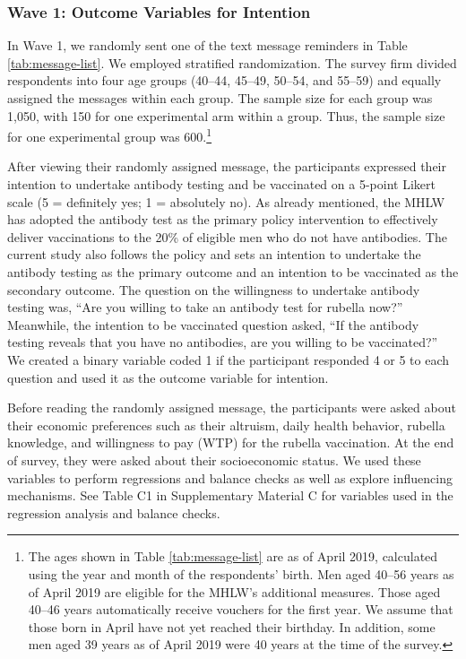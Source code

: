 \documentclass[
      12pt,
    a4paper
]{article}
\begin{document}
\hypertarget{wave1}{%
\subsubsection{Wave 1: Outcome Variables for Intention}\label{wave1}}

In Wave 1, we randomly sent one of the text message reminders in Table \ref{tab:message-list}. We employed stratified randomization. The survey firm divided respondents into four age groups (40--44, 45--49, 50--54, and 55--59) and equally assigned the messages within each group. The sample size for each group was 1,050, with 150 for one experimental arm within a group. Thus, the sample size for one experimental group was 600.\footnote{The ages shown in Table \ref{tab:message-list} are as of April 2019, calculated using the year and month of the respondents' birth. Men aged 40--56 years as of April 2019 are eligible for the MHLW's additional measures. Those aged 40--46 years automatically receive vouchers for the first year. We assume that those born in April have not yet reached their birthday. In addition, some men aged 39 years as of April 2019 were 40 years at the time of the survey.}

After viewing their randomly assigned message, the participants expressed their intention to undertake antibody testing and be vaccinated on a 5-point Likert scale (5 = definitely yes; 1 = absolutely no). As already mentioned, the MHLW has adopted the antibody test as the primary policy intervention to effectively deliver vaccinations to the 20\% of eligible men who do not have antibodies. The current study also follows the policy and sets an intention to undertake the antibody testing as the primary outcome and an intention to be vaccinated as the secondary outcome. The question on the willingness to undertake antibody testing was, ``Are you willing to take an antibody test for rubella now?'' Meanwhile, the intention to be vaccinated question asked, ``If the antibody testing reveals that you have no antibodies, are you willing to be vaccinated?'' We created a binary variable coded 1 if the participant responded 4 or 5 to each question and used it as the outcome variable for intention.

Before reading the randomly assigned message, the participants were asked about their economic preferences such as their altruism, daily health behavior, rubella knowledge, and willingness to pay (WTP) for the rubella vaccination. At the end of survey, they were asked about their socioeconomic status. We used these variables to perform regressions and balance checks as well as explore influencing mechanisms. See Table C1 in Supplementary Material C for variables used in the regression analysis and balance checks.
\end{document}
